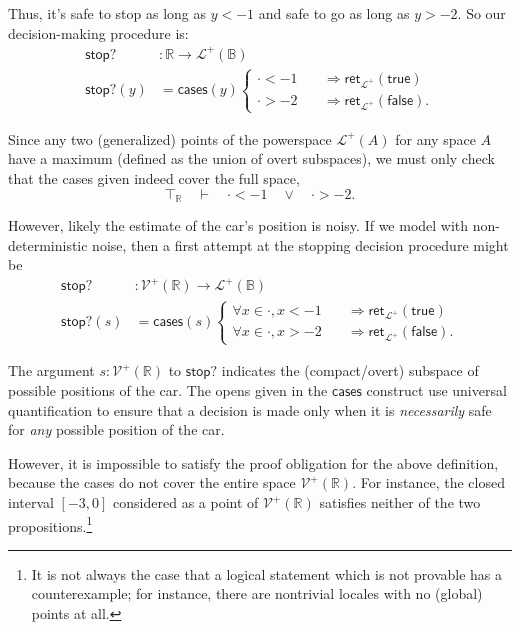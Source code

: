 \documentclass{article}           %
\newcommand{\R}{\mathbb{R}}
\newcommand{\bool}{\mathbb{B}}
\newcommand{\PLower}{\mathcal{L}^+}
\newcommand{\Viet}{{\mathcal{V}^+}}
\newcommand{\ret}[1]{\mathsf{ret}_{#1}}
\begin{document}
Thus, it's safe to stop as long as $y < -1$ and safe to go as long as $y > -2$. So our decision-making procedure is:
\begin{align*}
\mathsf{stop?} &: \R \to \PLower(\bool)
\\ \mathsf{stop?}(y) &= \mathsf{cases}(y)
\begin{cases}
\cdot < -1
  \quad &\Longrightarrow
   \ret{\PLower} (\mathsf{true})
\\
\cdot > -2
  \quad &\Longrightarrow
   \ret{\PLower}(\mathsf{false}).
\end{cases}
\end{align*}

Since any two (generalized) points of the powerspace $\PLower(A)$ for any space $A$ have a maximum (defined as the union of overt subspaces), we must only check that the cases given indeed cover the full space,
\[
\top_\R \quad \vdash \quad \cdot < -1 \quad \vee \quad \cdot > -2.
\]

However, likely the estimate of the car's position is noisy. If we model with non-deterministic noise, then a first attempt at the stopping decision procedure might be
\begin{align*}
\mathsf{stop?} &: \Viet(\R) \to \PLower(\bool)
\\ \mathsf{stop?}(s) &= \mathsf{cases}(s)
\begin{cases}
\forall x \in \cdot, x < -1
  \quad &\Longrightarrow
   \ret{\PLower} (\mathsf{true})
\\
\forall x \in \cdot, x > -2
  \quad &\Longrightarrow
   \ret{\PLower}(\mathsf{false}).
\end{cases}
\end{align*}

The argument $s : \Viet(\R)$ to $\mathsf{stop?}$ indicates the (compact/overt) subspace of possible positions of the car. The opens given in the $\mathsf{cases}$ construct use universal quantification to ensure that a decision is made only when it is \emph{necessarily} safe for \emph{any} possible position of the car.

However, it is impossible to satisfy the proof obligation for the above definition, because the cases do not cover the entire space $\Viet(\R)$. For instance, the closed interval $[-3, 0]$ considered as a point of $\Viet(\R)$ satisfies neither of the two propositions.\footnote{It is not always the case that a logical statement which is not provable has a counterexample; for instance, there are nontrivial locales with no (global) points at all.}
\end{document}
